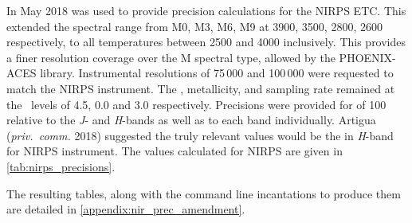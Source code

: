 In May 2018 \eniric{} was used to provide precision calculations for the {NIRPS} {ETC}.
This extended the spectral range from {M0}, {M3}, {M6}, {M9} at 3900, 3500, 2800, 2600\K{} respectively, to all temperatures between 2500\K{} and 4000\K{} inclusively.
This provides a finer resolution coverage over the M spectral type, allowed by the {PHOENIX-ACES} library.
Instrumental resolutions of 75\,000 and 100\,000 were requested to match the {NIRPS} instrument.
The \Logg{}, metallicity, and sampling rate remained at the~\citet{figueira_radial_2016} levels of 4.5, 0.0 and 3.0 respectively.
Precisions were provided for \snr{} of 100 relative to the \emph{J}- and \emph{H}-bands as well as to each band individually.
Artigua (\emph{priv.\ comm.} 2018) suggested the truly relevant values would be the \snr{} in \emph{H}-band for {NIRPS} instrument.
The values calculated for {NIRPS} are given in \cref{tab:nirps_precisions}.

The resulting tables, along with the command line incantations to produce them are detailed in \cref{appendix:nir_prec_amendment}.

\clearpage